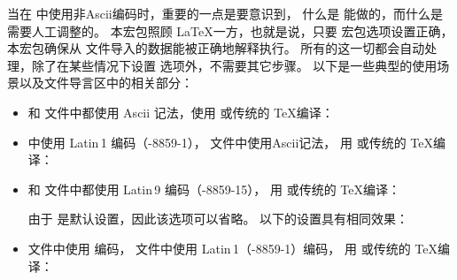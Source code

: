 当在  中使用非Ascii编码时，重要的一点是要意识到，
什么是 \biblatex 能做的，而什么是需要人工调整的。
本宏包照顾 \LaTeX 一方，也就是说，只要  宏包选项设置正确，
本宏包确保从  文件导入的数据能被正确地解释执行。
所有的这一切都会自动处理，除了在某些情况下设置  选项外，不需要其它步骤。
以下是一些典型的使用场景以及文件导言区中的相关部分：

\begin{itemize}
\setlength{\itemsep}{0pt}

\item
 和  文件中都使用 Ascii 记法，使用 \pdfTeX 或传统的 \TeX 编译：

\begin{ltxexample}
\usepackage{biblatex}
\end{ltxexample}

\item
 中使用 Latin\,1 编码（-8859-1）， 文件中使用Ascii记法，
用 \pdfTeX 或传统的 \TeX 编译：

\begin{ltxexample}
\usepackage[latin1]{inputenc}
\usepackage[bibencoding=ascii]{biblatex}
\end{ltxexample}

\item
 和  文件中都使用 Latin\,9 编码（-8859-15），
用 \pdfTeX 或传统的 \TeX 编译：

\begin{ltxexample}
\usepackage[latin9]{inputenc}
\usepackage[bibencoding=auto]{biblatex}
\end{ltxexample}
%
由于  是默认设置，因此该选项可以省略。
以下的设置具有相同效果：

\begin{ltxexample}
\usepackage[latin9]{inputenc}
\usepackage{biblatex}
\end{ltxexample}

\item
 文件中使用 \utf 编码， 文件中使用 Latin\,1（-8859-1）编码，
用 \pdfTeX 或传统的 \TeX 编译：


\end{itemize}
